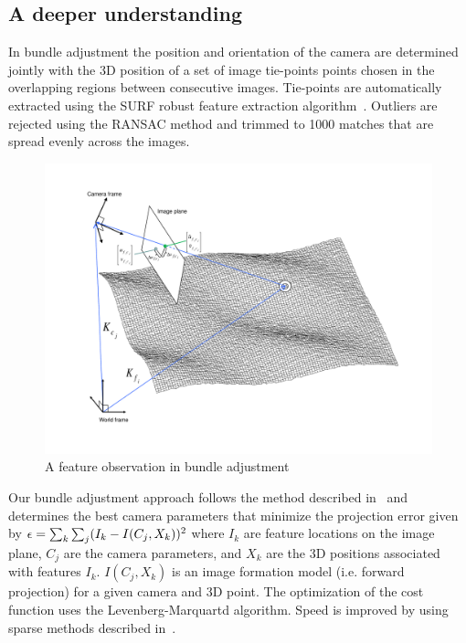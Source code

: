 \subsection{A deeper understanding}

In bundle adjustment the position and orientation of the camera are
determined jointly with the 3D position of a set of image tie-points
points chosen in the overlapping regions between consecutive images.
Tie-points are automatically extracted using the SURF robust feature
extraction algorithm~\cite{bay08surf}.  Outliers are rejected using
the RANSAC method and trimmed to 1000 matches that are spread evenly
across the images.

\begin{figure}[htp]
  \begin{center}
  \includegraphics[trim=20mm 20mm 20mm 15mm,clip,width=6in]{images/ba_feature_observation.pdf}
  \end{center}
  \caption{ A feature observation in bundle adjustment \citep{moore09} }
  \label{fig:ba_feature}
\end{figure}

Our bundle adjustment approach follows the method described
in~\cite{Triggs00:bundleadjustment} and determines the best camera
parameters that minimize the projection error given by ${\bf \epsilon}
= \sum_k\sum_j(I_k-I(C_j, X_k))^2$ where $I_k$ are feature locations
on the image plane, $C_j$ are the camera parameters, and $X_k$ are the
3D positions associated with features $I_k$. $I(C_j, X_k)$ is an image
formation model (i.e. forward projection) for a given camera and 3D
point.  The optimization of the cost function uses the
Levenberg-Marquartd algorithm. Speed is improved by using sparse
methods described in~\cite{Hartley00:bundleadjustment}.

